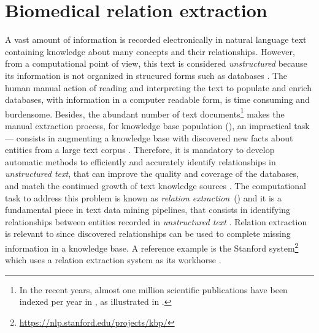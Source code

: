 \chapter{Biomedical relation extraction}
\label{c5}

A vast amount of information is recorded electronically in natural language text containing knowledge about many concepts and their relationships.
However, from a computational point of view, this text is considered \textit{unstructured} because its information is not organized in strucured forms such as databases \parencite{mccallum2005a}.
The human manual action of reading and interpreting the text to populate and enrich databases, with information in a computer readable form, is time consuming and burdensome.
Besides, the abundant number of text documents\footnote{In the recent years, almost one million scientific publications have been indexed per year in , as illustrated in .} makes the manual extraction process, for knowledge base population (), an impractical task--- consists in augmenting a knowledge base with discovered new facts about entities from a large text corpus \parencite{balog2018a}.
Therefore, it is mandatory to develop automatic methods to efficiently and accurately identify relationships in \textit{unstructured text}, that can improve the quality and coverage of the databases, and match the continued growth of text knowledge sources \parencite{ohta1997a,temkin2003a}.
The computational task to address this problem is known as \textit{relation extraction}~() and it is a fundamental piece in text data mining pipelines, that consists in identifying relationships between entities recorded in \textit{unstructured text} \parencite{bach2007a,pawar2017b,liu2020c}.
Relation extraction is relevant to  since discovered relationships can be used to complete missing information in a knowledge base.
A reference example is the Stanford  system\footnote{\url{https://nlp.stanford.edu/projects/kbp/}} which uses a relation extraction system as its workhorse \parencite{surdeanu2012a,angeli2014a}.

